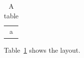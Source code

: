 \documentclass{article}
\begin{document}
\begin{table}[ht]
\centering
\begin{tabular}{c} a \end{tabular}
\caption{A table}\label{tab:main}
\end{table}
Table~\ref{tab:main} shows the layout.
\end{document}
